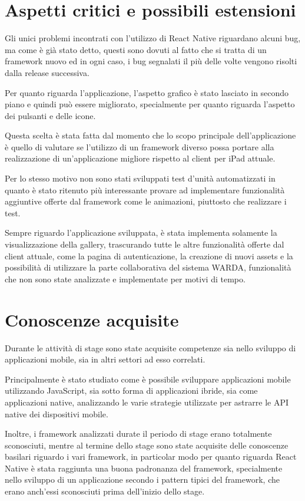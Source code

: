 \section{Aspetti critici e possibili estensioni}

Gli unici problemi incontrati con l'utilizzo di React Native riguardano alcuni bug, ma come è già stato detto, questi sono dovuti al fatto che si tratta di un framework nuovo ed in ogni caso, i bug segnalati il più delle volte vengono risolti dalla release successiva.

Per quanto riguarda l'applicazione, l'aspetto grafico è stato lasciato in secondo piano e quindi può essere migliorato, specialmente per quanto riguarda l'aspetto dei pulsanti e delle icone.

Questa scelta è stata fatta dal momento che lo scopo principale dell'applicazione è quello di valutare se l'utilizzo di un framework diverso possa portare alla realizzazione di un'applicazione migliore rispetto al client per iPad attuale.

Per lo stesso motivo non sono stati sviluppati test d'unità automatizzati in quanto è stato ritenuto più interessante provare ad implementare funzionalità aggiuntive offerte dal framework come le animazioni, piuttosto che realizzare i test.

Sempre riguardo l'applicazione sviluppata, è stata implementa solamente la visualizzazione della gallery, trascurando tutte le altre funzionalità offerte dal client attuale, come la pagina di autenticazione, la creazione di nuovi assets e la possibilità di utilizzare la parte collaborativa del sistema WARDA, funzionalità che non sono state analizzate e implementate per motivi di tempo.

\section{Conoscenze acquisite}

Durante le attività di stage sono state acquisite competenze sia nello sviluppo di applicazioni mobile, sia in altri settori ad esso correlati.

Principalmente è stato studiato come è possibile sviluppare applicazioni mobile utilizzando JavaScript, sia sotto forma di applicazioni ibride, sia come applicazioni native, analizzando le varie strategie utilizzate per astrarre le API native dei dispositivi mobile.

Inoltre, i framework analizzati durate il periodo di stage erano totalmente sconosciuti, mentre al termine dello stage sono state acquisite delle conoscenze basilari riguardo i vari framework, in particolar modo per quanto riguarda React Native è stata raggiunta una buona padronanza del framework, specialmente nello sviluppo di un applicazione secondo i pattern tipici del framework, che erano anch'essi sconosciuti prima dell'inizio dello stage.

